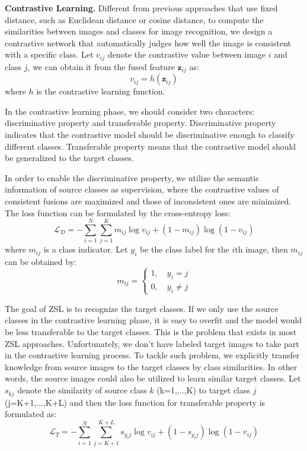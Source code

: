 \documentclass[10pt,twocolumn,letterpaper]{article}
\begin{document}
\textbf{Contrastive Learning.} Different from previous approaches that use fixed distance, such as Euclidean distance or cosine distance, to compute the similarities between images and classes for image recognition, we design a contrastive network that automatically judges how well the image is consistent with a specific class. Let $v_{ij}$ denote the contrastive value between image $i$ and class $j$, we can obtain it from the fused feature $\bm{z}_{ij}$ as:
\begin{equation}
  v_{ij} = h(\bm{z}_{ij})
  \label{equ:contrast}
\end{equation}
where $h$ is the contrastive learning function.

In the contrastive learning phase, we should consider two characters: discriminative property and transferable property. Discriminative property indicates that the contrastive model should be discriminative enough to classify different classes. Transferable property means that the contrastive model should be generalized to the target classes.

In order to enable the discriminative property, we utilize the semantic information of source classes as supervision, where the contrastive values of consistent fusions are maximized and those of inconsistent ones are minimized. The loss function can be formulated by the cross-entropy loss:
\begin{equation}
  \mathcal{L}_D = - \sum_{i=1}^{N} \sum_{j=1}^{K} m_{ij} \log v_{ij} + (1-m_{ij}) \log(1-v_{ij})
  \label{equ:discriminative}
\end{equation}
where $m_{ij}$ is a class indicator. Let $y_i$ be the class label for the $i$th image, then $m_{ij}$ can be obtained by:
\begin{equation}
  m_{ij} = \left\{\begin{matrix}
  1, \quad y_i = j
\\
0, \quad y_i \neq j
\end{matrix}\right.
  \label{equ:indicator}
\end{equation}

The goal of ZSL is to recognize the target classes. If we only use the source classes in the contrastive learning phase, it is easy to overfit and the model would be less transferable to the target classes. This is the problem that exists in most ZSL approaches. Unfortunately, we don't have labeled target images to take part in the contrastive learning process. To tackle such problem, we explicitly transfer knowledge from source images to the target classes by class similarities. In other words, the source images could also be utilized to learn similar target classes. Let $s_{kj}$ denote the similarity of source class $k$ (k=1,...,K) to target class $j$ (j=K+1,...,K+L) and then the loss function for transferable property is formulated as:
\begin{equation}
  \mathcal{L}_T = - \sum_{i=1}^{N} \sum_{j=K+1}^{K+L} s_{y_ij} \log v_{ij} + (1-s_{y_ij}) \log(1-v_{ij})
  \label{equ:transfer}
\end{equation}
\end{document}
